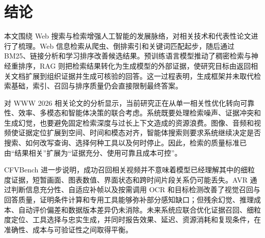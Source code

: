 \section{结论}

本文围绕 Web 搜索与检索增强人工智能的发展脉络，对相关技术和代表性论文进行了梳理。Web 信息检索从爬虫、倒排索引和关键词匹配起步，随后通过 BM25、链接分析和学习排序改善候选结果。预训练语言模型推动了稠密检索与神经重排序，RAG 则把检索结果转化为生成模型的外部证据，使研究目标由返回相关文档扩展到组织证据并生成可核验的回答。这一过程表明，生成框架并未取代检索基础，索引、召回与排序质量仍会直接限制最终答案。

对 WWW 2026 相关论文的分析显示，当前研究正在从单一相关性优化转向可靠性、效率、多模态和智能体决策的联合考虑。系统既要处理检索噪声、证据冲突和生成幻觉，也要避免固定检索深度与过长上下文造成的资源浪费。图像、音频和视频使证据定位扩展到空间、时间和模态对齐，智能体搜索则要求系统继续决定是否搜索、如何改写查询、选择何种工具以及何时停止。因此，检索的质量标准已由“结果相关”扩展为“证据充分、使用可靠且成本可控”。

CFVBench 进一步说明，成功召回相关视频并不意味着模型已经理解其中的细粒度证据，短暂画面、图表数值、界面状态和跨时间片段关系仍可能丢失。AVR 通过判断信息充分性、自适应补帧以及按需调用 OCR 和目标检测改善了视觉召回与回答质量，证明条件计算和专用工具能够弥补部分感知缺口；但残余幻觉、推理成本、自动评价偏差和数据版本差异仍未消除。未来系统应联合优化证据召回、细粒度定位、工具选择与忠实生成，并同时报告效果、延迟、资源消耗和复现条件，在准确性、成本与可验证性之间取得平衡。
